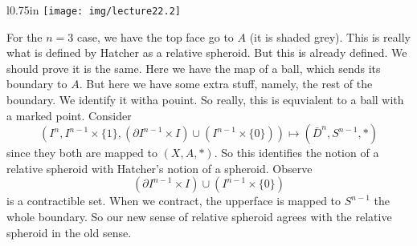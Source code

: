 \begin{wrapfigure}{l}{0.75in}
  \vspace{-12pt}
  \centering
  \texttt{[image: img/lecture22.2]}
  \vspace{-12pt}
\end{wrapfigure}
For the $n=3$ case, we have the top face go to $A$ (it is shaded
grey). This is really what is defined by Hatcher as a relative
spheroid.
But this is already defined. We should prove it is the same.
Here we have the map of a ball, which sends its boundary to
$A$. But here we have some extra stuff, namely, the rest of the
boundary. We identify it witha pouint. So really, this is
equvialent to a ball with a marked point.
Consider
\begin{equation}
\left(I^n,I^{n-1}\times\{1\},(\partial I^{n-1}\times I)\cup(I^{n-1}\times\{0\})\right)\mapsto(\bar{D}^{n},S^{n-1},*)
\end{equation}
since they both are mapped to $(X,A,*)$.
So this identifies the notion of a relative spheroid with
Hatcher's notion of a spheroid. Observe
\begin{equation*}
(\partial I^{n-1}\times I)\cup(I^{n-1}\times\{0\})
\end{equation*}
is a contractible set. When we contract, the upperface is mapped
to $S^{n-1}$ the whole boundary. So our new sense of relative
spheroid agrees with the relative spheroid in the old sense.
